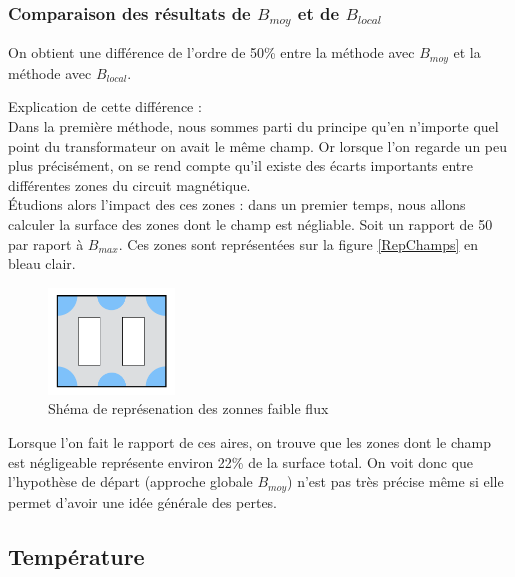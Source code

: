 \subsubsection{Comparaison des résultats de $B_{moy}$ et de $B_{local}$}

On obtient une différence de l'ordre de 50\% entre la méthode avec $B_{moy}$  et la méthode avec $B_{local}$.

Explication de cette différence : \\
	Dans la première méthode, nous sommes parti du principe qu'en n'importe quel point du transformateur on avait le même champ. Or lorsque l'on regarde un peu plus précisément, on se rend compte qu'il existe des écarts importants entre différentes zones du circuit magnétique.\\
Étudions alors l'impact des ces zones : dans un premier temps, nous allons calculer la surface des zones dont le champ est négliable. Soit un rapport de 50 par raport à $B_{max}$. Ces zones sont représentées sur la figure \ref{RepChamps} en bleau clair. 

\begin{figure}[ht]
	\begin{center}
	\includegraphics[width=0.30\textwidth]{images/TP3_zones_mortes}
	\caption{Shéma de représenation des zonnes faible flux}\label{img:RepChamps}
	\end{center}
\end{figure}
\FloatBarrier

Lorsque l'on fait le rapport de ces aires, on trouve que les zones dont le champ est négligeable représente environ 22\% de la surface total. On voit donc que l'hypothèse de départ (approche globale $B_{moy}$) n'est pas très précise même si elle permet d'avoir une idée générale des pertes.


\subsection{Température}

